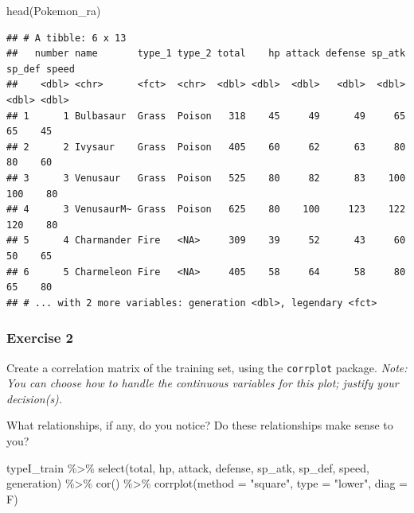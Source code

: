 \documentclass[
]{article}
\newenvironment{Shaded}{\begin{snugshade}}{\end{snugshade}}
\newcommand{\AttributeTok}[1]{\textcolor[rgb]{0.77,0.63,0.00}{#1}}
\newcommand{\FunctionTok}[1]{\textcolor[rgb]{0.00,0.00,0.00}{#1}}
\newcommand{\NormalTok}[1]{#1}
\newcommand{\SpecialCharTok}[1]{\textcolor[rgb]{0.00,0.00,0.00}{#1}}
\newcommand{\StringTok}[1]{\textcolor[rgb]{0.31,0.60,0.02}{#1}}
\begin{document}
\begin{Shaded}
\begin{Highlighting}[]
\FunctionTok{head}\NormalTok{(Pokemon\_ra)}
\end{Highlighting}
\end{Shaded}

\begin{verbatim}
## # A tibble: 6 x 13
##   number name       type_1 type_2 total    hp attack defense sp_atk sp_def speed
##    <dbl> <chr>      <fct>  <chr>  <dbl> <dbl>  <dbl>   <dbl>  <dbl>  <dbl> <dbl>
## 1      1 Bulbasaur  Grass  Poison   318    45     49      49     65     65    45
## 2      2 Ivysaur    Grass  Poison   405    60     62      63     80     80    60
## 3      3 Venusaur   Grass  Poison   525    80     82      83    100    100    80
## 4      3 VenusaurM~ Grass  Poison   625    80    100     123    122    120    80
## 5      4 Charmander Fire   <NA>     309    39     52      43     60     50    65
## 6      5 Charmeleon Fire   <NA>     405    58     64      58     80     65    80
## # ... with 2 more variables: generation <dbl>, legendary <fct>
\end{verbatim}

\hypertarget{exercise-2}{%
\subsubsection{Exercise 2}\label{exercise-2}}

Create a correlation matrix of the training set, using the
\texttt{corrplot} package. \emph{Note: You can choose how to handle the
continuous variables for this plot; justify your decision(s).}

What relationships, if any, do you notice? Do these relationships make
sense to you?

\begin{Shaded}
\begin{Highlighting}[]
\NormalTok{typeI\_train }\SpecialCharTok{\%\textgreater{}\%} \FunctionTok{select}\NormalTok{(total, hp, attack, defense, }
\NormalTok{                       sp\_atk, sp\_def, speed, generation) }\SpecialCharTok{\%\textgreater{}\%}
  \FunctionTok{cor}\NormalTok{() }\SpecialCharTok{\%\textgreater{}\%}
  \FunctionTok{corrplot}\NormalTok{(}\AttributeTok{method =} \StringTok{"square"}\NormalTok{, }\AttributeTok{type =} \StringTok{"lower"}\NormalTok{, }\AttributeTok{diag =}\NormalTok{ F)}
\end{Highlighting}
\end{Shaded}
\end{document}
